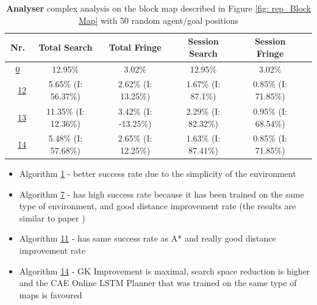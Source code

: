 \begin{table}[h!]
\bigskip

\begin{tabular}{|cc|c|c|c|c|c|}
\hline
\multicolumn{2}{|c|}{\textbf{Nr.}} & \textbf{Total Search} & \textbf{Total Fringe} & \textbf{Session Search} & \textbf{Session Fringe}\\
\hline
\hline
\multicolumn{2}{|c|}{\cellcolor{lightgray!20} \hyperref[tab: evalalgorithms]{0}} & 12.95\% & 3.02\% & 12.95\% & 3.02\%\\
\hline
\hline
\multicolumn{1}{|M{0.15cm}}{\cellcolor{cyan!40}} & \multicolumn{1}{M{0.15cm}|}{\cellcolor{blue!40} \hspace*{-0.5cm}\hyperref[tab: evalalgorithms]{12}} & 5.65\% (I: 56.37\%) & 2.62\% (I: 13.25\%) & 1.67\% (I: 87.1\%) & 0.85\% (I: 71.85\%)\\
\hline
\multicolumn{1}{|M{0.15cm}}{\cellcolor{cyan!40}} & \multicolumn{1}{M{0.15cm}|}{\cellcolor{red!40} \hspace*{-0.5cm}\hyperref[tab: evalalgorithms]{13}} & 11.35\% (I: 12.36\%) & 3.42\% (I: -13.25\%) & 2.29\% (I: 82.32\%) & 0.95\% (I: 68.54\%)\\
\hline
\multicolumn{1}{|M{0.15cm}}{\cellcolor{cyan!40}} & \multicolumn{1}{M{0.15cm}|}{\cellcolor{orange!40} \hspace*{-0.5cm}\hyperref[tab: evalalgorithms]{14}} & 5.48\% (I: 57.68\%) & 2.65\% (I: 12.25\%) & 1.63\% (I: 87.41\%) & 0.85\% (I: 71.85\%)\\
\hline
\end{tabular}


\caption{\textbf{Analyser} complex analysis on the block map described in Figure \ref{fig: rep_Block Map} with 50 random agent/goal positions}
\label{tab: eval_complex_analysis_map_2} 
\end{table}

\begin{itemize}
    \item Algorithm \hyperref[tab: evalalgorithms]{1} - better success rate due to the simplicity of the environment
    \item Algorithm \hyperref[tab: evalalgorithms]{7} - has high success rate because it has been trained on the same type of environment, and good distance improvement rate (the results are similar to paper \cite{inoue2019robot})
    \item Algorithm \hyperref[tab: evalalgorithms]{11} - has same success rate as A* and really good distance improvement rate
    \item Algorithm \hyperref[tab: evalalgorithms]{14} - GK Improvement is maximal, search space reduction is higher and the CAE Online LSTM Planner that was trained on the same type of maps is favoured
\end{itemize}

\pagebreak